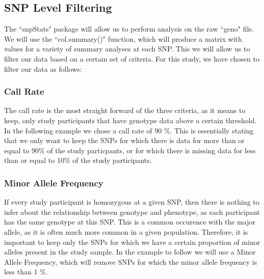 \documentclass[11pt]{article}\usepackage[]{graphicx}\usepackage[]{color}
\begin{document}
\subsection{SNP Level Filtering}
The ``snpStats" package will allow us to perform analysis on the raw ``geno" file.  We will use the ``col.summary()" function, which will produce a matrix with values for a variety of summary analyses at each SNP.
This we will allow us to filter our data based on a certain set of criteria.  For this study, we have chosen to filter our data as follows: 
\subsubsection*{Call Rate}
The call rate is the most straight forward of the three criteria, as it means to keep, only study participants that have genotype data above a certain threshold. In the following example we chose a call rate of 90 \%.  This is essentially stating that we only want to keep the SNPs for which there is data for more than or equal to 90\% of the study particpants, or for which there is missing data for less than or equal to 10\% of the study participants.
\subsubsection*{Minor Allele Frequency}
If every study participant is homozygous at a given SNP, then there is nothing to infer about the relationship between genotype and phenotype, as each participant has the same genotype at this SNP.  This is a common occurence with the major allele, as it is often much more common in a given population.  Therefore, it is important to keep only the SNPs for which we have a certain proportion of minor alleles present in the study sample.  In the example to follow we will use a Minor Allele Frequency, which will remove SNPs for which the minor allele frequency is less than 1 \%.
\end{document}
